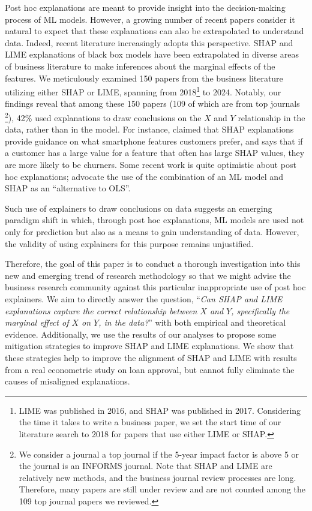 \documentclass[12pt]{article}  %
\begin{document}
Post hoc explanations are meant to provide insight into the decision-making process of ML models. However, a growing number of recent papers consider it natural to expect that these explanations can also be extrapolated to understand data. 
Indeed, recent literature increasingly adopts this perspective. SHAP and LIME explanations of black box models have been extrapolated in diverse areas of business literature to make inferences about the marginal effects of the features. We meticulously examined 150 papers from the business literature utilizing either SHAP or LIME, spanning from 2018\footnote{LIME was published in 2016, and SHAP was published in 2017. Considering the time it takes to write a business paper, we set the start time of our literature search to 2018 for papers that use either LIME or SHAP.} to 2024. Notably, our findings reveal that among these 150 papers (109 of which are from top journals \footnote{We consider a journal a top journal if the 5-year impact factor is above 5 or the journal is an INFORMS journal. Note that SHAP and LIME are relatively new methods, and the business journal review processes are long. Therefore, many papers are still under review and are not counted among the 109 top journal papers we reviewed.}), 42\% used explanations to draw conclusions on the $X$ and $Y$ relationship in the data, rather than in the model. For instance, \cite{park2024extracting} claimed that SHAP explanations provide guidance on what smartphone features customers prefer, and \cite{jiang24churn} says that if a customer has a large value for a feature that often has large SHAP values, they are more likely to be churners. Some recent work is quite optimistic about post hoc explanations; \citep{berger2023supply} advocate the use of the combination of an ML model and SHAP as an ``alternative to OLS''.

Such use of explainers to draw conclusions on data suggests an emerging paradigm shift in which, through post hoc explanations, ML models are used not only for prediction but also as a means to gain understanding of data. However, the validity of using explainers for this purpose remains unjustified. 

Therefore, the goal of this paper is to conduct a thorough investigation into this new and emerging trend of research methodology so that we might advise the business research community
against this particular inappropriate use of post hoc explainers. We aim to directly answer the question, %
``\emph{Can SHAP and LIME explanations capture the correct relationship between $X$ and $Y$, specifically the marginal effect of $X$ on $Y$, in the data?}''
with both empirical and theoretical evidence. Additionally, we use the results of our analyses to propose some mitigation strategies to improve SHAP and LIME explanations. We show that these strategies help to improve the alignment of SHAP and LIME with results from a real econometric study on loan approval, but cannot fully eliminate the causes of misaligned explanations.
\end{document}
